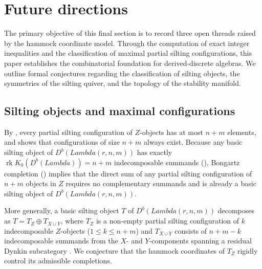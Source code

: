 \documentclass[11pt, a4paper]{article}
\theoremstyle{definition}
\def\Lambda{Lambda}%
\def\mathcal#1{#1}%
\def\Db{D^b}%
\newcommand{\Db}{\mathcal{D}^b}
\begin{document}

\section{Future directions}
\label{sec:future}

The primary objective of this final section is to record three open threads raised by the hammock coordinate model. Through the computation of exact integer inequalities and the classification of maximal partial silting configurations, this paper establishes the combinatorial foundation for derived-discrete algebras. We outline formal conjectures regarding the classification of silting objects, the symmetries of the silting quiver, and the topology of the stability manifold.

\subsection{Silting objects and maximal configurations}
\label{subsec:future-bijection}

By , every partial silting configuration of $\mathcal Z$-objects has at most $n+m$ elements, and  shows that configurations of size $n+m$ always exist. Because any basic silting object of $\Db(\Lambda(r,n,m))$ has exactly $\operatorname{rk} K_0(\Db(\Lambda)) = n+m$ indecomposable summands (), Bongartz completion () implies that the direct sum of any partial silting configuration of $n+m$ objects in $\mathcal Z$ requires no complementary summands and is already a basic silting object of $\Db(\Lambda(r,n,m))$.

More generally, a basic silting object $T$ of $\Db(\Lambda(r,n,m))$ decomposes as $T = T_{\mathcal Z} \oplus T_{\mathcal X \cup \mathcal Y}$, where $T_{\mathcal Z}$ is a non-empty partial silting configuration of $k$ indecomposable $\mathcal Z$-objects ($1 \le k \le n+m$) and $T_{\mathcal X \cup \mathcal Y}$ consists of $n+m-k$ indecomposable summands from the $\mathcal X$- and $\mathcal Y$-components spanning a residual Dynkin subcategory \cite{BPP2017}. We conjecture that the hammock coordinates of $T_{\mathcal Z}$ rigidly control its admissible completions.
\end{document}
